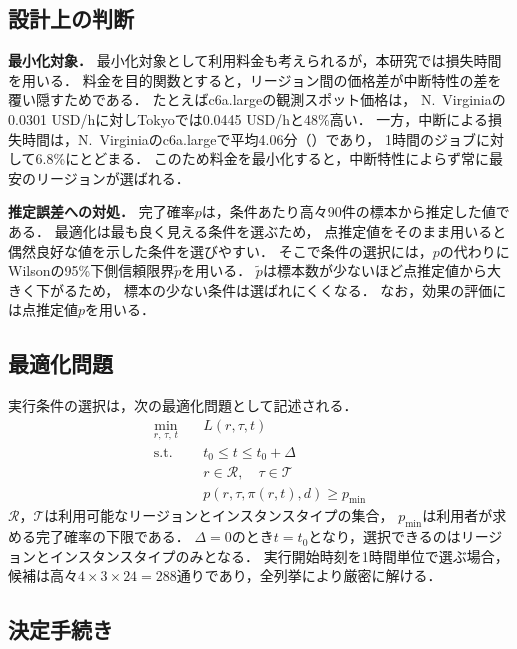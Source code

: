 \documentclass[submit,techrep,noauthor]{ipsj}
\begin{document}
\subsection{設計上の判断}

\textbf{最小化対象．}
最小化対象として利用料金も考えられるが，本研究では損失時間を用いる．
料金を目的関数とすると，リージョン間の価格差が中断特性の差を覆い隠すためである．
たとえばc6a.largeの観測スポット価格は，
N.~Virginiaの0.0301 USD/hに対しTokyoでは0.0445 USD/hと48\%高い．
一方，中断による損失時間は，N.~Virginiaのc6a.largeで平均4.06分（）であり，
1時間のジョブに対して6.8\%にとどまる．
このため料金を最小化すると，中断特性によらず常に最安のリージョンが選ばれる．

\textbf{推定誤差への対処．}
完了確率$p$は，条件あたり高々90件の標本から推定した値である．
最適化は最も良く見える条件を選ぶため，
点推定値をそのまま用いると偶然良好な値を示した条件を選びやすい．
そこで条件の選択には，$p$の代わりに
Wilsonの95\%下側信頼限界$\tilde{p}$\cite{Wilson1927}を用いる．
$\tilde{p}$は標本数が少ないほど点推定値から大きく下がるため，
標本の少ない条件は選ばれにくくなる．
なお，効果の評価には点推定値$p$を用いる．

\subsection{最適化問題}

実行条件の選択は，次の最適化問題として記述される．
\begin{equation}
\begin{aligned}
\min_{r,\,\tau,\,t}\quad & L(r,\tau,t)\\
\mathrm{s.t.}\quad
 & t_0 \leq t \leq t_0 + \Delta\\
 & r\in\mathcal{R},\quad \tau\in\mathcal{T}\\
 & p(r,\tau,\pi(r,t),d) \geq p_{\min}
\end{aligned}
\label{eq:opt}
\end{equation}
$\mathcal{R}$，$\mathcal{T}$は利用可能なリージョンとインスタンスタイプの集合，
$p_{\min}$は利用者が求める完了確率の下限である．
$\Delta=0$のとき$t=t_0$となり，選択できるのはリージョンとインスタンスタイプのみとなる．
実行開始時刻を1時間単位で選ぶ場合，
候補は高々$4\times3\times24=288$通りであり，全列挙により厳密に解ける．

\subsection{決定手続き}
\label{sec:procedure}
\end{document}

